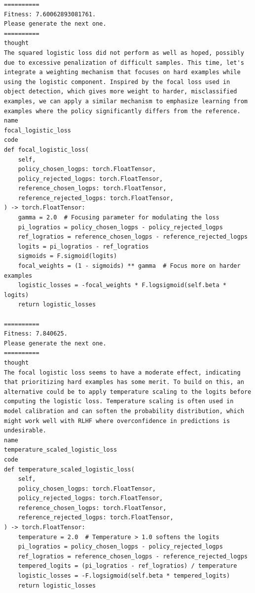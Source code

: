 \documentclass{article}
\theoremstyle{plain}
\theoremstyle{definition}
\theoremstyle{remark}
\begin{document}
\begin{lstlisting}
==========
Fitness: 7.60062893081761.
Please generate the next one.
==========
thought
The squared logistic loss did not perform as well as hoped, possibly due to excessive penalization of difficult samples. This time, let's integrate a weighting mechanism that focuses on hard examples while using the logistic component. Inspired by the focal loss used in object detection, which gives more weight to harder, misclassified examples, we can apply a similar mechanism to emphasize learning from examples where the policy significantly differs from the reference.
name
focal_logistic_loss
code
def focal_logistic_loss(
    self,
    policy_chosen_logps: torch.FloatTensor,
    policy_rejected_logps: torch.FloatTensor,
    reference_chosen_logps: torch.FloatTensor,
    reference_rejected_logps: torch.FloatTensor,
) -> torch.FloatTensor:
    gamma = 2.0  # Focusing parameter for modulating the loss
    pi_logratios = policy_chosen_logps - policy_rejected_logps
    ref_logratios = reference_chosen_logps - reference_rejected_logps
    logits = pi_logratios - ref_logratios
    sigmoids = F.sigmoid(logits)
    focal_weights = (1 - sigmoids) ** gamma  # Focus more on harder examples
    logistic_losses = -focal_weights * F.logsigmoid(self.beta * logits)
    return logistic_losses
    
==========
Fitness: 7.840625.
Please generate the next one.
==========
thought
The focal logistic loss seems to have a moderate effect, indicating that prioritizing hard examples has some merit. To build on this, an alternative could be to apply temperature scaling to the logits before computing the logistic loss. Temperature scaling is often used in model calibration and can soften the probability distribution, which might work well with RLHF where overconfidence in predictions is undesirable.
name
temperature_scaled_logistic_loss
code
def temperature_scaled_logistic_loss(
    self,
    policy_chosen_logps: torch.FloatTensor,
    policy_rejected_logps: torch.FloatTensor,
    reference_chosen_logps: torch.FloatTensor,
    reference_rejected_logps: torch.FloatTensor,
) -> torch.FloatTensor:
    temperature = 2.0  # Temperature > 1.0 softens the logits
    pi_logratios = policy_chosen_logps - policy_rejected_logps
    ref_logratios = reference_chosen_logps - reference_rejected_logps
    tempered_logits = (pi_logratios - ref_logratios) / temperature
    logistic_losses = -F.logsigmoid(self.beta * tempered_logits)
    return logistic_losses
    

\end{lstlisting}
\end{document}
